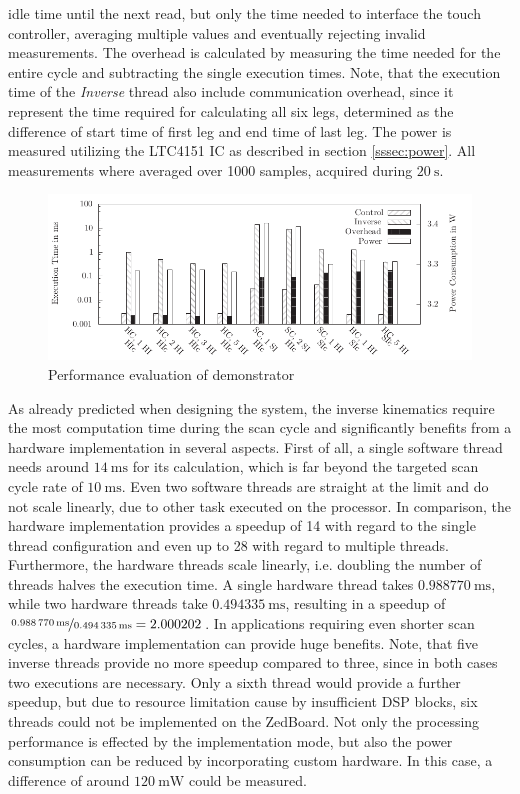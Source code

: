 idle time until the next read, but only the time needed to interface the touch
controller, averaging multiple values and eventually rejecting invalid
measurements. The overhead is calculated by measuring the time needed for the
entire cycle and subtracting the single execution times. Note, that the
execution time of the \emph{Inverse} thread also include communication
overhead, since it represent the time required for calculating all six legs,
determined as the difference of start time of first leg and end time of last
leg. The power is measured utilizing the LTC4151 \ac{IC} as described in
section \ref{sssec:power}. All measurements where averaged over 1000 samples,
acquired during $\SI{20}{\second}$.
\begin{figure}
	\centering
	\includegraphics{../figures/demo_perf}
	\caption{Performance evaluation of demonstrator}
	\label{fig:demo_perf}
\end{figure}

As already predicted when designing the system, the inverse kinematics require
the most computation time during the scan cycle and significantly benefits
from a hardware implementation in several aspects. First of all, a single
software thread needs around $\SI{14}{\milli\second}$ for its calculation,
which is far beyond the targeted scan cycle rate of $\SI{10}{\milli\second}$.
Even two software threads are straight at the limit and do not scale linearly,
due to other task executed on the processor. In comparison, the hardware
implementation provides a speedup of 14 with regard to the single thread
configuration and even up to 28 with regard to multiple threads. Furthermore,
the hardware threads scale linearly, i.e. doubling the number of threads
halves the execution time. A single hardware thread takes
$\SI{0.988770}{\milli\second}$, while two hardware threads take
$\SI{0.494335}{\milli\second}$, resulting in a speedup of $\nicefrac{\SI{0.988
770}{\milli\second}}{\SI{0.494335}{\milli\second}}=2.000202$. In applications
requiring even shorter scan cycles, a hardware implementation can provide huge
benefits. Note, that five inverse threads provide no more speedup compared to
three, since in both cases two executions are necessary. Only a sixth thread
would provide a further speedup, but due to resource limitation cause by
insufficient \ac{DSP} blocks, six threads could not be implemented on the
ZedBoard. Not only the processing performance is effected by the
implementation mode, but also the power consumption can be reduced by
incorporating custom hardware. In this case, a difference of around
$\SI{120}{\milli\watt}$ could be measured.

